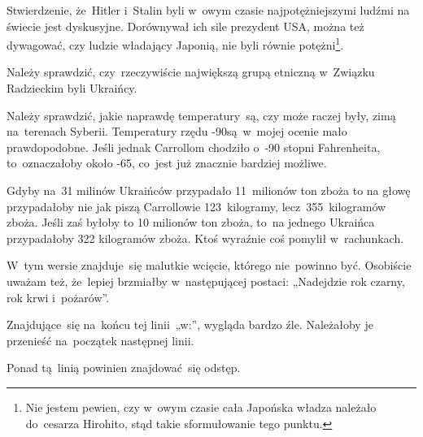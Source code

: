 \documentclass[a4paper,11pt]{article}
\begin{document}
\vspace{\spaceFour}


\start {} Stwierdzenie, że~Hitler i~Stalin byli w~owym czasie
najpotężniejszymi ludźmi na świecie jest dyskusyjne. Dorównywał ich
sile prezydent USA, można też dywagować, czy ludzie władający Japonią,
nie byli równie potężni\footnote{Nie jestem pewien, czy w~owym czasie
  cała Japońska władza należało do~cesarza Hirohito, stąd takie
  sformułowanie tego punktu.}.

\vspace{\spaceFour}


\start {} Należy sprawdzić, czy~rzeczywiście największą grupą
etniczną w~Związku Radzieckim byli Ukraińcy.

\vspace{\spaceFour}


\start {} Należy sprawdzić, jakie naprawdę temperatury~są, czy
może raczej były, zimą na~terenach Syberii. Temperatury rzędu
-90\textcelsius są~w~mojej ocenie mało prawdopodobne. Jeśli jednak
Carrollom chodziło o~-90 stopni Fahrenheita, to~oznaczałoby około
-65\textcelsius, co~jest już znacznie bardziej możliwe.

\vspace{\spaceFour}


 Gdyby na~31 milinów Ukraińców przypadało 11~milionów ton
zboża to na głowę przypadałoby nie jak piszą Carrollowie
123~kilogramy, lecz~355~kilogramów zboża. Jeśli zaś byłoby to 10
milionów ton zboża, to~na jednego Ukraińca przypadałoby 322 kilogramów
zboża. Ktoś wyraźnie coś pomylił w~rachunkach.

\vspace{\spaceFour}


\start {} W~tym wersie znajduje~się malutkie wcięcie,
którego nie~powinno być. Osobiście uważam też, że~lepiej brzmiałby
w~następującej postaci: „Nadejdzie rok czarny, rok krwi i~pożarów”.

\vspace{\spaceFour}


\start {} Znajdujące~się na~końcu tej linii~„w:”, wygląda
bardzo źle. Należałoby je przenieść na~początek następnej linii.

\vspace{\spaceFour}


\start {} Ponad tą~linią powinien znajdować~się odstęp.

\vspace{\spaceFour}
\end{document}
